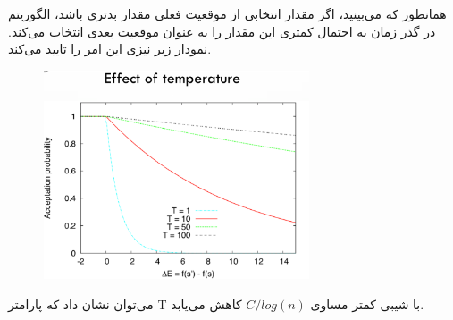 \begin{flushright}
    همانطور که می‌بینید، اگر مقدار انتخابی از موقعیت فعلی مقدار بدتری باشد، الگوریتم در گذر زمان به احتمال کمتری این مقدار را به عنوان موقعیت بعدی انتخاب می‌کند.
    نمودار زیر نیزی این امر را تایید می‌کند.
    \begin{figure}[H]
        \centering
        \includegraphics[width=0.7\textwidth]{source/temp-effect.png}
        \label{fig:temp-effect}
    \end{figure}

    می‌توان نشان داد که پارامتر T با شیبی کمتر مساوی $C/log(n)$ کاهش می‌یابد.
\end{flushright}
